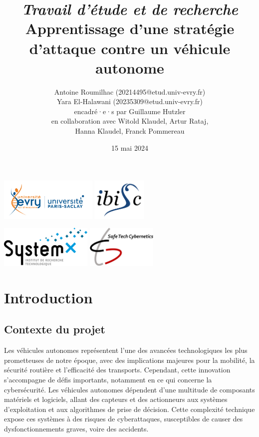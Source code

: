 \documentclass[a4paper]{article}
\title{\textit{Travail d'étude et de recherche} \\ \textbf{Apprentissage d'une stratégie d'attaque
contre un véhicule autonome}}
\author{Antoine Roumilhac (20214495@etud.univ-evry.fr) \\ Yara El-Halawani (20235309@etud.univ-evry.fr) \\ encadré·e·s par Guillaume Hutzler \\ en collaboration avec Witold Klaudel, Artur Rataj, \\ Hanna Klaudel, Franck Pommereau}
\date{15 mai 2024}
\begin{document}
    \maketitle

    \vspace*{\fill}

    \begin{center}
        \includegraphics[height=2cm]{logo_ueve.png}
        \includegraphics[height=2cm]{logo_ibisc.png}

        \includegraphics[height=2cm]{logo_systemx.png}
        \includegraphics[height=2cm]{logo_safetech.png}
    \end{center}

    \newpage

    \section{Introduction}

    \subsection{Contexte du projet}

    Les véhicules autonomes représentent l'une des avancées technologiques les plus prometteuses de notre époque, avec des implications majeures pour la mobilité, la sécurité routière et l'efficacité des transports. Cependant, cette innovation s'accompagne de défis importants, notamment en ce qui concerne la cybersécurité. Les véhicules autonomes dépendent d'une multitude de composants matériels et logiciels, allant des capteurs et des actionneurs aux systèmes d'exploitation et aux algorithmes de prise de décision. Cette complexité technique expose ces systèmes à des risques de cyberattaques, susceptibles de causer des dysfonctionnements graves, voire des accidents.
\end{document}
